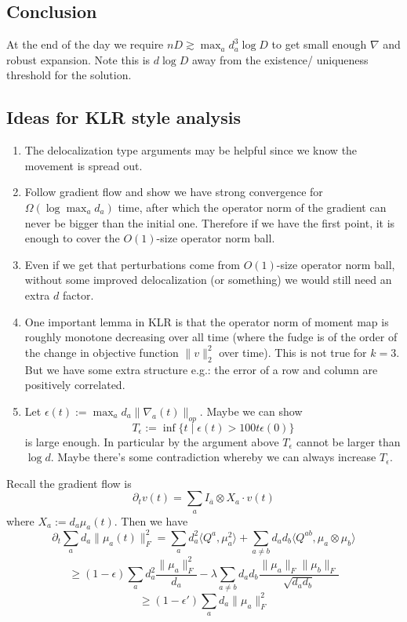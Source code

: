 \documentclass{article}
\begin{document}
\subsection{Conclusion}
At the end of the day we require $nD \gtrsim \max_{a} d_{a}^{3} \log D$ to get small enough $\nabla$ and robust expansion. Note this is $d \log D$ away from the existence/ uniqueness threshold for the solution. 

\subsection{Ideas for KLR style analysis}
\begin{enumerate}
    \item The delocalization type arguments may be helpful since we know the movement is spread out. 
    \item Follow gradient flow and show we have strong convergence for $\Omega(\log \max_{a} d_{a})$ time, after which the operator norm of the gradient can never be bigger than the initial one. Therefore if we have the first point, it is enough to cover the $O(1)$-size operator norm ball. 
    \item Even if we get that perturbations come from $O(1)$-size operator norm ball, without some improved delocalization (or something) we would still need an extra $d$ factor. 
    \item One important lemma in KLR is that the operator norm of moment map is roughly monotone decreasing over all time (where the fudge is of the order of the change in objective function $\|v\|_{2}^{2}$ over time). This is not true for $k=3$. But we have some extra structure e.g.: the error of a row and column are positively correlated. 
    \item Let $\epsilon(t) := \max_{a} d_{a} \|\nabla_{a}(t)\|_{op}$. Maybe we can show 
    \[ T_{\epsilon} := \inf \{ t \mid \epsilon(t) > 100 t \epsilon(0) \}  \]
    is large enough. In particular by the argument above $T_{\epsilon}$ cannot be larger than $\log d$. Maybe there's some contradiction whereby we can always increase $T_{\epsilon}$. 
\end{enumerate}

Recall the gradient flow is 
\[ \partial_{t} v(t) = \sum_{a} I_{\overline{a}} \otimes X_{a} \cdot v(t)   \]
where $X_{a} := d_{a} \mu_{a}(t)$. Then we have
\[ \partial_{t} \sum_{a} d_{a} \|\mu_{a}(t)\|_{F}^{2} = \sum_{a} d_{a}^{2} \langle Q^{a}, \mu_{a}^{2} \rangle + \sum_{a \neq b} d_{a} d_{b} \langle Q^{ab}, \mu_{a} \otimes \mu_{b} \rangle  \]
\[ \geq (1-\epsilon) \sum_{a} d_{a}^{2} \frac{\|\mu_{a}\|_{F}^{2}}{d_{a}} - \lambda \sum_{a \neq b} d_{a} d_{b} \frac{\|\mu_{a}\|_{F} \|\mu_{b}\|_{F}}{\sqrt{d_{a} d_{b}}}   \]
\[ \geq (1-\epsilon') \sum_{a} d_{a} \|\mu_{a}\|_{F}^{2}   \]
\end{document}
